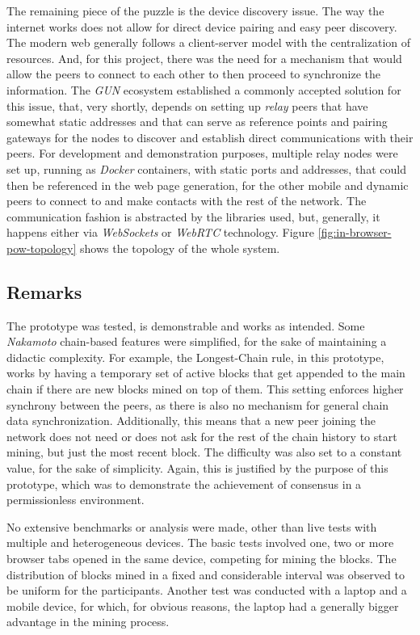 \documentclass[journal]{IEEEtran}
\begin{document}
The remaining piece of the puzzle is the device discovery issue. The way the internet works does not
allow for direct device pairing and easy peer discovery. The modern web generally follows a 
client-server model with the centralization of resources. And, for this project, there was the need
for a mechanism that would allow the peers to connect to each other to then proceed to synchronize
the information. The \emph{GUN} ecosystem established a commonly accepted solution for this issue, that, 
very shortly, depends on setting up \emph{relay} peers that have somewhat static addresses and that can 
serve as reference points and pairing gateways for the nodes to discover and establish direct communications 
with their peers. For development and demonstration purposes, multiple relay nodes were set up, running 
as \emph{Docker} containers, with static ports and addresses, that could then be referenced in the web 
page generation, for the other mobile and dynamic peers to connect to and make contacts with the rest of the network.
The communication fashion is abstracted by the libraries used, but, generally, it happens either via \emph{WebSockets}
or \emph{WebRTC} technology. Figure \ref{fig:in-browser-pow-topology} shows the topology of the whole system.

\subsection{Remarks}

The prototype was tested, is demonstrable and works as intended. Some \emph{Nakamoto} chain-based
features were simplified, for the sake of maintaining a didactic complexity. For example, 
the Longest-Chain rule, in this prototype, works by having a temporary set of active blocks 
that get appended to the main chain if there are new blocks mined on top
of them. This setting enforces higher synchrony between the peers, as there is also no mechanism for
general chain data synchronization. Additionally, this means that a new peer joining the network does not
need or does not ask for the rest of the chain history to start mining, but just the most recent block.
The difficulty was also set to a constant value, for the sake of simplicity.
Again, this is justified by the purpose of this prototype, which was to demonstrate the achievement
of consensus in a permissionless environment.

No extensive benchmarks or analysis were made, other than live tests with multiple
and heterogeneous devices. The basic tests involved one, two or more browser tabs
opened in the same device, competing for mining the blocks. The distribution of blocks mined
in a fixed and considerable interval was observed to be uniform for the participants. Another test was
conducted with a laptop and a mobile device, for which, for obvious reasons, the laptop
had a generally bigger advantage in the mining process.
\end{document}
